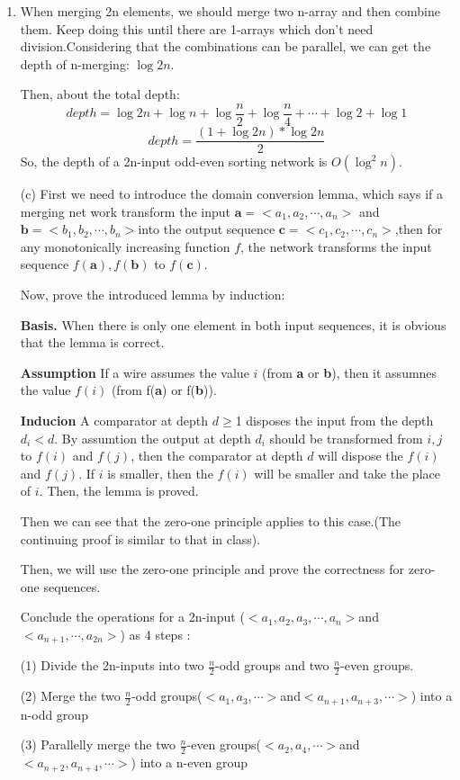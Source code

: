 \documentclass[12pt,a4paper]{article}
\makeatletter
\newtheorem*{solution}{Solution}
\theoremstyle{definition}
\renewenvironment{solution}[1][Solution] {\par\pushQED{\qed}\normalfont\topsep6\p@\@plus6\p@\relax\trivlist\item[\hskip\labelsep\bfseries#1\@addpunct{.}]\ignorespaces}{\popQED\endtrivlist\@endpefalse} \makeatother
\makeatother
\begin{document}
\begin{enumerate}
\begin{solution}
	When merging 2n elements, we should merge two n-array and then combine them. Keep doing this until there are 1-arrays which don't need division.Considering that the combinations can be parallel, we can get the depth of n-merging: $\log 2n $.
	
	Then, about the total depth:
	$$depth=\log 2n + \log n+\log {\frac{n}{2}}+\log {\frac{n}{4}+\cdots+\log 2+\log 1}  $$
	$$depth=\frac{(1+\log{2n})*\log{2n}}{2}$$
	So, the depth of a 2n-input odd-even sorting network is $O(\log^2 n)$.
	
	(c) First we need to introduce the domain conversion lemma, which says if a merging net work transform the input $\textbf{a}=<a_1,a_2,\cdots,a_n>$ and $\textbf{b}=<b_1,b_2,\cdots,b_n>$into the output sequence $\textbf{c}=<c_1,c_2,\cdots,c_n>$,then for any monotonically increasing function $f$, the network transforms the input sequence $f(\textbf{a}),f(\textbf{b})$ to $f(\textbf{c})$.
	
	Now, prove the introduced lemma by induction:
	
	\textbf{Basis.} When there is only one element in both input sequences, it is obvious that the lemma is correct.
	
	\textbf{Assumption} If a wire assumes the value $i$ (from \textbf{a} or \textbf{b}), then it assumnes the value $f(i)$ (from f(\textbf{a}) or f(\textbf{b})).
	
	\textbf{Inducion} A comparator at depth $d\geq$1 disposes the input from the depth $d_i<d$. By assumtion the output at depth $d_i$ should be transformed from $i,j$ to $f(i)$ and $f(j)$, then the comparator at depth $d$ will dispose the $f(i)$ and $f(j)$. If $i$ is smaller, then the $f(i)$ will be smaller and take the place of $i$. Then, the lemma is proved.
	
	Then we can see that the zero-one principle applies to this case.(The continuing proof is similar to that in class).
	
	Then, we will use the zero-one principle and  prove the correctness for zero-one sequences.
	
	Conclude the operations for a 2n-input ($<a_1,a_2,a_3,\cdots,a_n>$and $<a_{n+1},\cdots,a_{2n}>$) as 4 steps :
	
	(1) Divide the 2n-inputs into two $\frac{n}{2}$-odd groups and two $\frac{n}{2}$-even groups.
	
	(2) Merge the two $\frac{n}{2}$-odd groups($<a_1,a_3,\cdots>$and$<a_{n+1},a_{n+3},\cdots>$) into a n-odd group 
	
	(3) Parallelly merge the two $\frac{n}{2}$-even groups($<a_2,a_4,\cdots>$and$<a_{n+2},a_{n+4},\cdots>$) into a n-even group
	

\end{solution}
\end{enumerate}
\end{document}
